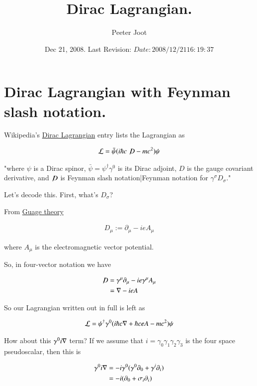 \documentclass{article}
\title{ Dirac Lagrangian. }
\author{Peeter Joot}
\date{ Dec 21, 2008.  Last Revision: $Date: 2008/12/21 16:19:37 $ }
\newcommand{\Dslash}[0]{ \not\!D }
\begin{document}
\maketitle{}


\section{ Dirac Lagrangian with Feynman slash notation. }

Wikipedia's \href{http://en.wikipedia.org/wiki/Lagrangian#Dirac_Lagrangian}{Dirac Lagrangian} entry lists the Lagrangian as

\begin{align*}
\LL = \bar \psi (i \hbar c \Dslash - mc^2) \psi
\end{align*}

"where $\psi\!$ is a Dirac spinor, $\bar \psi = \psi^\dagger \gamma^0$ is its Dirac adjoint, $D\!$ is the gauge covariant derivative, and $\Dslash$ is Feynman slash notation|Feynman notation for $\gamma^\sigma D_\sigma\!$."

Let's decode this.  First, what's $D_\sigma$?

From \href{http://en.wikipedia.org/wiki/Gauge_covariant_derivative}{Guage theory}

\begin{align*}
D_\mu := \partial_\mu - i e A_\mu
\end{align*}

where $A_\mu$ is the electromagnetic vector potential.

So, in four-vector notation we have

\begin{align*}
\Dslash 
&= \gamma^\mu \partial_\mu - i e \gamma^\mu A_\mu \\
&= \grad - i e A \\
\end{align*}

So our Lagrangian written out in full is left as

\begin{align}\label{eqn:lag1}
\mathcal{L} = \psi^\dagger \gamma^0 ( i \hbar c \nabla + \hbar c e A - mc^2) \psi
\end{align}

How about this $\gamma^0 i \nabla$ term?  If we assume that $i = \gamma_0 \gamma_1 \gamma_2 \gamma_3$ is the four space pseudoscalar, then this is

\begin{align*}
\gamma^0 i \nabla
&= - i \gamma^0 (\gamma^0 \partial_0 + \gamma^i \partial_i) \\
&= - i (\partial_0 + \sigma_i \partial_i) \\
\end{align*}
\end{document}
